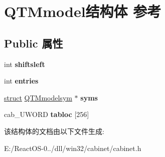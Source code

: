 \hypertarget{struct_q_t_mmodel}{}\section{Q\+T\+Mmodel结构体 参考}
\label{struct_q_t_mmodel}
\subsection*{Public 属性}
\begin{DoxyCompactItemize}
\item 
\mbox{\label{struct_q_t_mmodel_a29fbf85f4952232bb89589c3583ebdfc}} 
int {\bfseries shiftsleft}
\item 
\mbox{\label{struct_q_t_mmodel_a8c52d1a6b2a011651970902828230dc6}} 
int {\bfseries entries}
\item 
\mbox{\label{struct_q_t_mmodel_a9f763f1cbd8a277e4a373e806d6d4ee7}} 
\hyperlink{interfacestruct}{struct} \hyperlink{struct_q_t_mmodelsym}{Q\+T\+Mmodelsym} $\ast$ {\bfseries syms}
\item 
\mbox{\label{struct_q_t_mmodel_acba3a547b4eb90820a03e15235a65176}} 
cab\+\_\+\+U\+W\+O\+RD {\bfseries tabloc} \mbox{[}256\mbox{]}
\end{DoxyCompactItemize}


该结构体的文档由以下文件生成\+:\begin{DoxyCompactItemize}
\item 
E\+:/\+React\+O\+S-\/0../dll/win32/cabinet/cabinet.\+h\end{DoxyCompactItemize}
